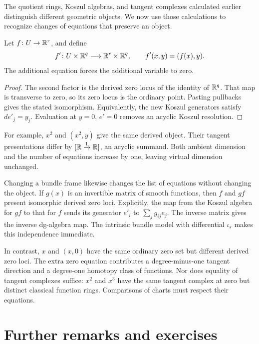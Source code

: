 The quotient rings, Koszul algebras, and tangent complexes calculated
earlier distinguish different geometric objects. We now use those
calculations to recognize changes of equations that preserve an object.

Let $f\colon U\to\mathbb{R}^r$, and define
\[
 f'\colon U\times\mathbb{R}^q\longrightarrow\mathbb{R}^r\times\mathbb{R}^q,
 \qquad f'(x,y)=(f(x),y).
\]
The additional equation forces the additional variable to zero.


\begin{proof}
The second factor is the derived zero locus of the identity of $\mathbb{R}^q$.
That map is transverse to zero, so its zero locus is the ordinary point.
Pasting pullbacks gives the stated isomorphism.
Equivalently, the new Koszul generators satisfy $de'_j=y_j$.
Evaluation at $y=0$, $e'=0$ removes an acyclic Koszul resolution.
\end{proof}

For example, $x^2$ and $(x^2,y)$ give the same derived object.
Their tangent presentations differ by
$[\mathbb{R}\xrightarrow1\mathbb{R}]$, an acyclic summand.
Both ambient dimension and the number of equations increase by one,
leaving virtual dimension unchanged.

Changing a bundle frame likewise changes the list of equations
without changing the object. If $g(x)$ is an invertible matrix of
smooth functions, then $f$ and $g f$ present isomorphic derived zero loci.
Explicitly, the map from the Koszul algebra for $gf$ to that for $f$
sends its generator $e'_i$ to $\sum_jg_{ij}e_j$.
The inverse matrix gives the inverse dg-algebra map.
The intrinsic bundle model with differential $\iota_s$ makes this
independence immediate.

In contrast, $x$ and $(x,0)$ have the same ordinary zero set but
different derived zero loci. The extra zero equation contributes a
degree-minus-one tangent direction and a degree-one homotopy class of functions.
Nor does equality of tangent complexes suffice: $x^2$ and $x^3$
have the same tangent complex at zero but distinct classical
function rings. Comparisons of charts must respect their equations.

\section{Further remarks and exercises}

